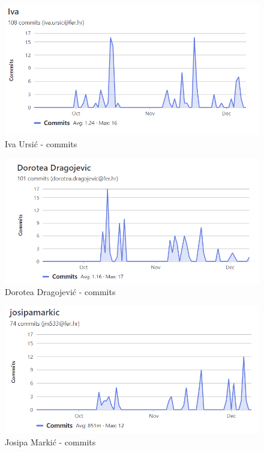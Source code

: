         \begin{figure}[H]
            \includegraphics[scale=1]{slike/commits_iva_ursic.png} %
			
			\centering
			\caption{Iva Ursić - commits}
			\label{fig:Iva Ursić commits}
			\end{figure}
         \begin{figure}[H]
            \includegraphics[scale=1]{slike/commits_dorotea_dragojevic.png} %
			
			\centering
			\caption{Dorotea Dragojević - commits}
			\label{fig:Dorotea Dragojević - commits}
			\end{figure}
         \begin{figure}[H]
            \includegraphics[scale=1]{slike/commits_josipa_markic.png} %
			
			\centering
			\caption{Josipa Markić - commits}
			\label{fig:Josipa Markić commits}
			\end{figure}
